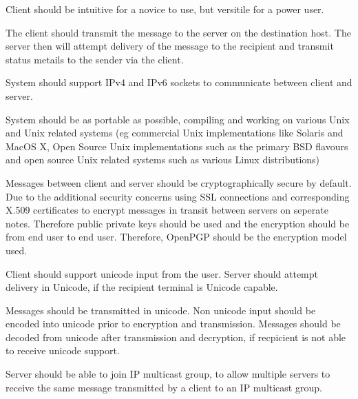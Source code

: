 
Client should be intuitive for a novice to use, but versitile for a
power user.


The client should transmit the message to the server on the destination
host. The server then will attempt delivery of the message to the
recipient and transmit status metails to the sender via the client.


System should support IPv4 and IPv6 sockets to communicate between
client and server. 


System should be as portable as possible, compiling and working on 
various Unix and Unix related systems (eg commercial Unix
implementations like Solaris and MacOS X, Open Source Unix 
implementations such as the primary BSD flavours and open source Unix
related systems such as various Linux distributions) 


Messages between client and server should be cryptographically secure by
default. Due to the additional security concerns using SSL connections
and corresponding X.509 certificates to encrypt messages in transit
between servers on seperate notes. Therefore public private keys should
be used and the encryption should be from end user to end user.
Therefore, OpenPGP should be the encryption model used.


Client should support unicode input from the user. Server should attempt
delivery in Unicode, if the recipient terminal is Unicode capable. 

Messages should be transmitted in unicode. Non unicode input should be
encoded into unicode prior to encryption and transmission. Messages
should be decoded from unicode after transmission and decryption, if
recpicient is not able to receive unicode support. 


Server should be able to join IP multicast group, to allow multiple
servers to receive the same message transmitted by a client to an IP
multicast group. 
